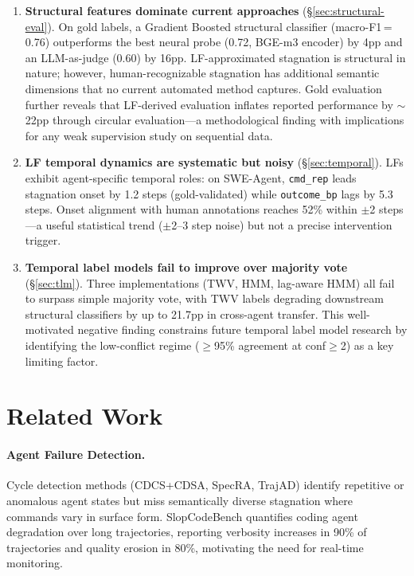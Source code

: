 \documentclass[11pt]{article}
\begin{document}
\begin{enumerate}[leftmargin=*,itemsep=2pt]

\item \textbf{Structural features dominate current approaches} (\S\ref{sec:structural-eval}). On gold labels, a Gradient Boosted structural classifier (macro-F1\,=\,0.76) outperforms the best neural probe (0.72, BGE-m3 encoder) by 4pp and an LLM-as-judge (0.60) by 16pp. LF-approximated stagnation is structural in nature; however, human-recognizable stagnation has additional semantic dimensions that no current automated method captures. Gold evaluation further reveals that LF-derived evaluation inflates reported performance by $\sim$22pp through circular evaluation---a methodological finding with implications for any weak supervision study on sequential data.

\item \textbf{LF temporal dynamics are systematic but noisy} (\S\ref{sec:temporal}). LFs exhibit agent-specific temporal roles: on SWE-Agent, \texttt{cmd\_rep} leads stagnation onset by 1.2 steps (gold-validated) while \texttt{outcome\_bp} lags by 5.3 steps. Onset alignment with human annotations reaches 52\% within $\pm$2 steps---a useful statistical trend ($\pm$2--3 step noise) but not a precise intervention trigger.

\item \textbf{Temporal label models fail to improve over majority vote} (\S\ref{sec:tlm}). Three implementations (TWV, HMM, lag-aware HMM) all fail to surpass simple majority vote, with TWV labels degrading downstream structural classifiers by up to 21.7pp in cross-agent transfer. This well-motivated negative finding constrains future temporal label model research by identifying the low-conflict regime ($\geq$95\% agreement at conf$\geq$2) as a key limiting factor.

\end{enumerate}

\section{Related Work}
\label{sec:related}

\paragraph{Agent Failure Detection.}
Cycle detection methods (CDCS+CDSA, SpecRA, TrajAD) identify repetitive or anomalous agent states but miss semantically diverse stagnation where commands vary in surface form. SlopCodeBench quantifies coding agent degradation over long trajectories, reporting verbosity increases in 90\% of trajectories and quality erosion in 80\%, motivating the need for real-time monitoring.
\end{document}

